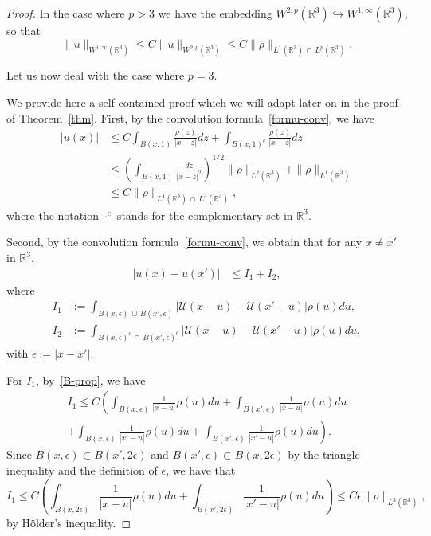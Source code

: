 \documentclass[AHL,Unicode,longabstracts,published]{cedram}
\newcommand{\R}{\mathbb{R}}
\newcommand{\clU}{\mathcal{U}}
\renewcommand{\leq}{\leqslant}
\newcommand{\eps}{\epsilon}
\begin{document}
\begin{proof}
In the case where $p>3$ we have the embedding $W^{2,p} (\R^3) \hookrightarrow W^{1,\infty} (\R^3)$, so that
\begin{equation}\label{cotestokes}
\|u\|_{W^{1,\infty} \left(\R^3\right)}\leq C\|u\|_{W^{2,p} \left(\R^3\right)} \leq C \| \rho\|_{L^1 \left(\R^3\right)\,\cap\,L^p \left(\R^3\right)}.
\end{equation}

Let us now deal with the case where $p=3$.

We provide here a self-contained proof which we will adapt later on in the proof of Theorem~\ref{thm}. First, by the convolution formula~\eqref{formu-conv}, we have
\begin{align*}
|u(x)| &\leq C \int_{B(x,1)} \frac{\rho(z)}{|x-z|} dz + \int_{B(x,1)^c}\frac{\rho(z)}{|x-z|} dz
\\ &\leq \left(\int_{B(x,1)}\frac{dz}{|x-z|^2} \right)^{1/2} \|\rho\|_{L^2\left(\R^3\right)}+\|\rho\|_{L^1\left(\R^3\right)}
\\ &\leq C \|\rho\|_{L^1\left(\R^3\right)\,\cap\, L^3\left(\R^3\right)},
\end{align*}
where the notation $\cdot^c$ stands for the complementary set in $\R^3$.

Second, by the convolution formula~\eqref{formu-conv}, we obtain that for any $x\neq x'$ in $\R^3$,
\begin{align*}
|u(x)-u(x') |&\leq I_1 +I_2,
\end{align*}
where
\begin{align*}
I_1 &:= \int_{B(x,\epsilon)\,\cup\,B(x',\epsilon) } \left|\clU(x-u)-\clU(x'-u)\right|\rho(u)du, \\
I_2 &:= \int_{B(x,\epsilon)^c\,\cap\,B(x',\epsilon)^c} \left|\clU(x-u)-\clU(x'-u)\right|\rho(u)du,
\end{align*}
with $\epsilon :=|x-x'|$.

For $I_1$, by~\eqref{B-prop}, we have
\begin{multline*}
I_1 \leq C \left(\int_{B(x,\epsilon)} \frac{1}{|x-u|}\rho(u)du + \int_{B(x',\epsilon)} \frac{1}{|x-u|}\rho(u)du\right.
\\
\left. + \int_{B(x,\epsilon)} \frac{1}{|x'-u|}\rho(u)du + \int_{B(x',\epsilon)} \frac{1}{|x'-u|}\rho(u)du \right).
\end{multline*}
Since $B(x,\eps) \subset B(x',2\eps) $ and $ B(x',\eps) \subset B(x,2\eps)$ by the triangle inequality and the definition of $\epsilon$, we have that
\[
I_1 \leq C \left(\int_{B(x,2\epsilon) } \frac{1}{|x-u|}\rho(u)du + \int_{B(x',2\epsilon)} \frac{1}{|x'-u|}\rho(u)du \right) \leq C \epsilon \|\rho\|_{L^3 \left(\R^3\right)},
\]
by H\"older's inequality.


\end{proof}
\end{document}
